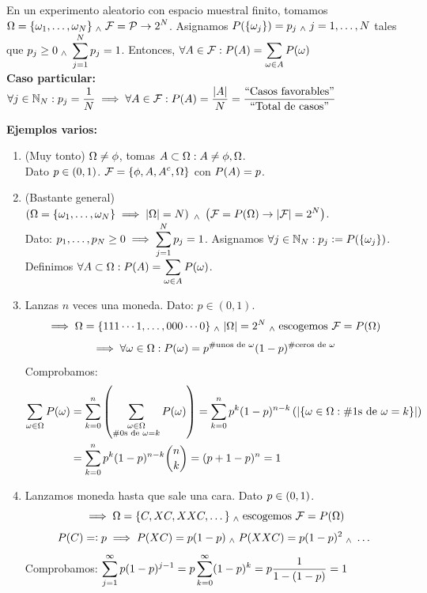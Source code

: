 \begin{ejem}
	En un experimento aleatorio con espacio muestral finito, tomamos \\
	$\displaystyle \Omega = \{\omega_1, \dots, \omega_N\}  \; _{\wedge} \; \mathcal{F} = \mathcal{P} \rightarrow 2^N$. Asignamos $\displaystyle P(\{\omega_j\}) = p_j \; _{\wedge} \; j = 1, \dots, N$ tales que $\displaystyle p_j\geq 0 \; _{\wedge} \; \sum_{j=1}^{N} p_j = 1$. Entonces, $\displaystyle\forall A \in \mathcal{F} : P(A) = \sum_{\omega \in A} P(\omega)$ \\
	\textbf{Caso particular: }$\displaystyle \forall j \in \mathbb{N}_N : p_j = \frac{1}{N} \implies \forall A \in \mathcal{F} : P(A) = \frac{|A|}{N} = \frac{\text{``Casos favorables''}}{\text{``Total de casos''}}$
\end{ejem}
\textbf{Ejemplos varios:}
\begin{enumerate}%
	\item (Muy tonto) $\displaystyle\Omega \ne \phi$, tomas $\displaystyle A \subset \Omega : A\ne \phi, \Omega$. \\
	      Dato $\displaystyle p\in (0, 1)$. $\displaystyle\mathcal{F} = \{\phi, A, A^c, \Omega\}$ con $\displaystyle P(A) = p$.
	\item (Bastante general) $\displaystyle\left(\Omega = \{\omega_1, \dots, \omega_N\} \implies |\Omega| = N\right) \; _{\wedge} \; \left(\mathcal{F} = P(\Omega) \rightarrow |\mathcal{F}|=2^N\right)$. \\
	      Dato: $\displaystyle p_1, \dots, p_N \ge 0 \implies \sum_{j=1}^N p_j=1$.
	      Asignamos $\displaystyle \forall j\in \mathbb{N}_N : p_j\vcentcolon= P(\{\omega_j\})$.\\
	      Definimos $\displaystyle \forall A\subset \Omega : P(A) = \sum_{\omega \in A}P(\omega)$.\\
	\item Lanzas $n$ veces una moneda. Dato: $p \in (0,1)$.
	      \[\implies \Omega = \{111\cdots1, \dots, 000\cdots0\} \; _{\wedge} \; |\Omega|=2^N \; _{\wedge} \; \text{escogemos } \mathcal{F}=P(\Omega)\]
	      \[\implies \forall \omega \in \Omega : P(\omega)= p^{\#\text{unos de }\omega} (1-p)^{\#\text{ceros de }\omega}\]
	      Comprobamos:
	      \begin{equation*}
		      \begin{split}
			      \displaystyle\sum_{\omega \in \Omega} P(\omega) & =\sum_{k=0}^n \left(\sum_{\substack{\omega\in \Omega                                         \\
			      \#\text{0s de }\omega = k}} P(\omega)\right)=\sum_{k=0}^n p^k (1-p)^{n-k}\left(|\{\omega\in \Omega :\#\text{1s de } \omega=k\}|\right) \\
			                                            & =\sum_{k=0}^np^k(1-p)^{n-k} \binom{n}{k} = (p+1-p)^n=1
		      \end{split}
	      \end{equation*}
	\item Lanzamos moneda hasta que sale una cara. Dato $\displaystyle p\in (0,1)$.
	      \[\implies \Omega = \{C, XC, XXC, \dots\} \; _{\wedge} \; \text{escogemos } \mathcal{F}=P(\Omega)\]
	      \[P(C)=\vcentcolon p \implies P(XC)=p(1-p) \; _{\wedge} \; P(XXC)=p(1-p)^2 \; _{\wedge} \; \dots\]
	      Comprobamos: $\displaystyle\sum_{j=1}^{\infty} p(1-p)^{j-1} = p\sum_{k=0}^\infty(1-p)^k = p \frac{1}{1-(1-p)} = 1$
\end{enumerate}

